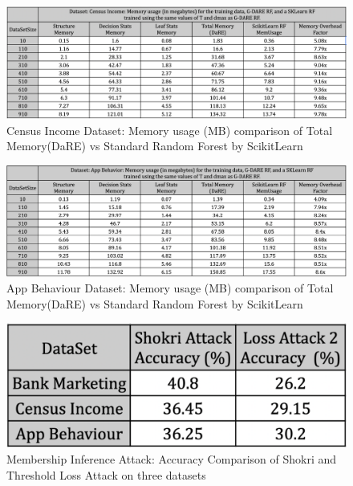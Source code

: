 \documentclass[11pt,letterpaper]{article}
\begin{document}
    \begin{figure}[h]
    \centering
    \includegraphics[width=\textwidth]{tables/Memory_Census.png}
    \caption{Census Income Dataset: Memory usage (MB) comparison of Total Memory(DaRE) vs Standard Random Forest by ScikitLearn}
    \label{fig:memusagecensusincome}
    \end{figure}

    \begin{figure}[h]
    \centering
    \includegraphics[width=\textwidth]{tables/Memory_App_Behavior.png}
    \caption{App Behaviour Dataset: Memory usage (MB) comparison of Total Memory(DaRE) vs Standard Random Forest by ScikitLearn}
    \label{fig:memusageappbehviour}
\end{figure}
    

\begin{figure}[h]
    \centering
    \includegraphics[width=3 in]{tables/MIA_Results.png}
    \caption{Membership Inference Attack: Accuracy Comparison of Shokri and Threshold Loss Attack on three datasets}
    \label{fig:MIA-attacks}
\end{figure}
\end{document}
